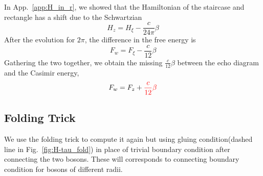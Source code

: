 \documentclass{article}
\begin{document}
In App.~\ref{app:H_in_r}, we showed that the Hamiltonian of the staircase and rectangle has a shift due to the Schwartzian
\begin{equation}
H_{z} = H_{\xi} - \frac{c}{24\pi} \beta 
\end{equation}
After the evolution for $2\pi$, the difference in the free energy is
\begin{equation}
F_w = F_{\xi} - \frac{c}{12} \beta 
\end{equation}
Gathering the two together, we obtain the missing $\frac{c}{12} \beta$ between the echo diagram and the Casimir energy, 
\begin{equation}
F_{w} = F_z + {\color{red} \frac{c}{12}\beta }
\end{equation}


\subsection{Folding Trick}


We use the folding trick to compute it again but using gluing condition(dashed line in Fig.~\ref{fig:H-tau_fold}) in place of trivial boundary condition after connecting the two bosons. These will corresponds to connecting boundary condition for bosons of different radii.
\end{document}

